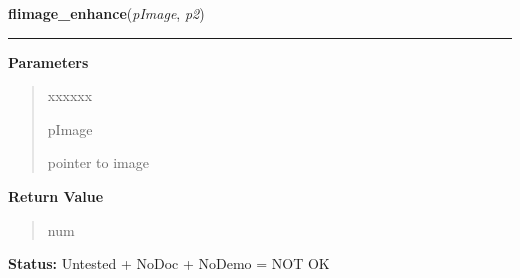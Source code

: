 \hspace{.8\funcindent}\begin{boxedminipage}{\funcwidth}

    \raggedright \textbf{flimage\_enhance}(\textit{pImage}, \textit{p2})

    \vspace{-1.5ex}

    \rule{\textwidth}{0.5\fboxrule}
\setlength{\parskip}{2ex}
\setlength{\parskip}{1ex}
      \textbf{Parameters}
      \vspace{-1ex}

      \begin{quote}
        \begin{Ventry}{xxxxxx}

          \item[pImage]

          pointer to image

        \end{Ventry}

      \end{quote}

      \textbf{Return Value}
    \vspace{-1ex}

      \begin{quote}
      num

      \end{quote}

\textbf{Status:} Untested + NoDoc + NoDemo = NOT OK



    \end{boxedminipage}

    \label{xformslib:library:flimage_from_pixmap}

    \vspace{0.5ex}

